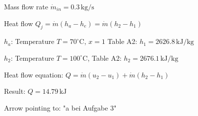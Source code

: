 Mass flow rate \( \dot{m}_{in} = 0.3 \, \text{kg/s} \)  

Heat flow \( Q_j = \dot{m}(h_a - h_e) = \dot{m}(h_2 - h_1) \)  

\( h_a \):  
Temperature \( T = 70^\circ \text{C} \), \( x = 1 \)  
Table A2: \( h_1 = 2626.8 \, \text{kJ/kg} \)  

\( h_2 \):  
Temperature \( T = 100^\circ \text{C} \), Table A2: \( h_2 = 2676.1 \, \text{kJ/kg} \)  

Heat flow equation:  
\( Q = \dot{m}(u_2 - u_1) + \dot{m}(h_2 - h_1) \)  

Result: \( Q = 14.79 \, \text{kJ} \)  

Arrow pointing to: "a bei Aufgabe 3"